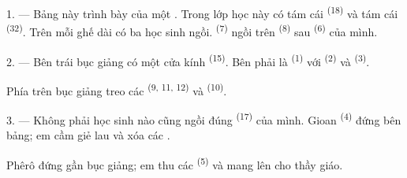 %

\VUsaut{2.0mm}
\VUsaut{3.2mm}
\VUsaut{2.6mm}
\VUsaut{3.4mm}
\VUornamento{9pt}
\VUsaut{5.0mm}
\VUsaut{3.0mm}
\VUfilet{16mm}
\VUsaut{5.6mm}

\VUsaut{1.4mm}
\VUsaut{2.2mm}
\VUfilet{20mm}
\VUsaut{6.4mm}

\VUsaut{3.0mm}

1. --- Bảng này trình bày  của một . Trong lớp
học này có tám cái  \textsuperscript{(18)} và tám cái 
\textsuperscript{(32)}. Trên mỗi ghế dài có ba học sinh ngồi. 
\textsuperscript{(7)} ngồi trên  \textsuperscript{(8)} sau 
\textsuperscript{(6)} của mình.

2. --- Bên trái bục giảng có một  cửa kính \textsuperscript{(15)}. Bên phải
là  \textsuperscript{(1)} với  \textsuperscript{(2)} và
 \textsuperscript{(3)}.

Phía trên bục giảng treo các  \textsuperscript{(9, 11, 12)} và
 \textsuperscript{(10)}.

3. --- Không phải học sinh nào cũng ngồi đúng  \textsuperscript{(17)} của
mình. Gioan \textsuperscript{(4)} đứng bên bảng; em cầm giẻ lau và xóa các
.

Phêrô đứng gần bục giảng; em thu các  \textsuperscript{(5)} và mang lên
cho thầy giáo.

